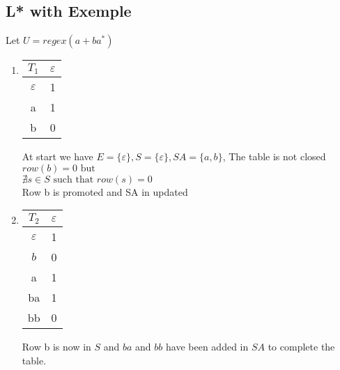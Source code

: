 \subsection{L* with Exemple}
Let $U = regex(a + ba^*)$
\begin{enumerate}
  \item \quad
        \begin{center}
          \begin{tabular}{c || c }
            $T_1$         & $\varepsilon$ \\ [0.5ex]
            \hline\hline
            $\varepsilon$ & 1             \\
            \hline \hline
            a             & 1             \\
            b             & 0             \\
          \end{tabular}
          \quad
          \begin{minipage}{0.5\textwidth}
            At start we have $E = \{\varepsilon\}, S = \{\varepsilon\}, SA = \{a, b\}$,
            The table is not closed \\
            $row(b) = 0 \text{ but }$ \\
            $\nexists s \in S \text{ such that } row(s) = 0$ \\
            Row b is promoted and SA in updated
          \end{minipage}
        \end{center}
  \item \quad
        \begin{center}
          \begin{tabular}{c || c }
            $T_2$         & $\varepsilon$ \\ [0.5ex]
            \hline\hline
            $\varepsilon$ & 1             \\
            $b$           & 0             \\
            \hline \hline
            a             & 1             \\
            ba            & 1             \\
            bb            & 0             \\
          \end{tabular}
          \quad
          \begin{minipage}{0.5\textwidth}
            Row b is now in $S$ and $ba$ and $bb$ have been added in $SA$ to complete the table.\\

\end{minipage}
\end{center}
\end{enumerate}
